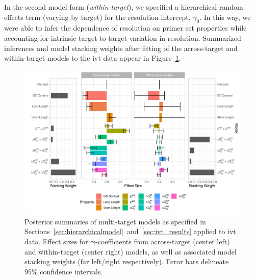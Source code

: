 \documentclass[../thesis.tex]{subfiles}
\begin{document}
In the second model form (\emph{within-target}), we specified a hierarchical random effects term (varying by target) for the resolution intercept, $\gamma_0$. In this way, we were able to infer the dependence of resolution on primer set properties while accounting for intrinsic target-to-target variation in resolution. Summarized inferences and model stacking weights after fitting of the across-target and within-target models to the \gls{ivt}  data appear in Figure~\ref{fig:ivt_eval}.

\begin{figure}[!tpb] 
\centering
\includegraphics[width=6in]{../figures/chapter2/paper_ivt_eval_fig.png}
\caption{Posterior summaries of multi-target models as specified in Sections~\ref{sec:hierarchicalmodel}~and~\ref{sec:ivt_results} applied to \gls{ivt}  data. Effect sizes for $\bm{\gamma}$-coefficients from across-target (center left) and within-target (center right) models, as well as associated model stacking weights (far left/right respectively). Error bars delineate 95\% confidence intervals. \label{fig:ivt_eval}}
\end{figure}
\end{document}
